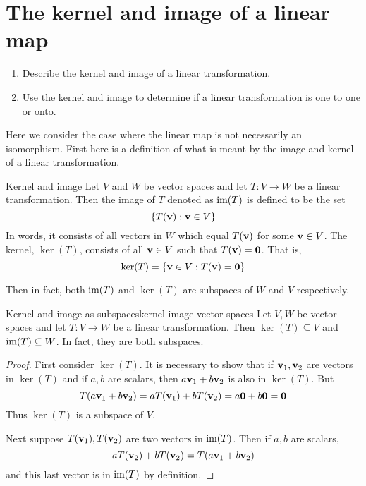 \section{The kernel and image of a linear map}

\begin{outcome}
  \begin{enumerate}
  \item Describe the kernel and image of a linear transformation.
  \item Use the kernel and image to determine if a linear
    transformation is one to one or onto.
  \end{enumerate}
\end{outcome}

Here we consider the case where the linear map is not necessarily an
isomorphism. First here is a definition of what is meant by the image and
kernel of a linear transformation.

\begin{definition}{Kernel and image}{}
Let $V$ and $W$ be vector spaces and let $T:V\rightarrow W$ be a linear transformation. Then the image of $T$
denoted as $\mbox{\rm im}(T) $ is defined to be the set
\begin{equation*}
\left\{T(\mbox{\bf v}):\mbox{\bf v}\in V\right\}
\end{equation*}
In words, it consists of all vectors in $W$ which equal $T(\mbox{\bf v})$ for some $
\mbox{\bf v}\in V$. The kernel, $\ker (T)$,
consists of all $\mbox{\bf v}\in V$ such that $T(\mbox{\bf v})=\mbox{\bf 0}$. That is,
\begin{equation*}
\ker (T) =\left\{\mbox{\bf v}\in V:T(\mbox{\bf v})=\mbox{\bf 0}\right\}
\end{equation*}
\end{definition}

Then in fact, both $\mbox{\rm im}(T) $ and $\ker (T) $
are subspaces of $W$ and $V$ respectively.

\begin{proposition}{Kernel and image as subspaces}{kernel-image-vector-spaces}
Let $V,W$ be vector spaces and let $T:V\rightarrow W$ be a linear transformation. Then $\ker (
T) \subseteq V$ and $\mbox{\rm im}(T) \subseteq W$. In fact, they are both subspaces.
\end{proposition}

\begin{proof}
First consider $\ker (T)$. It is necessary to
show that if $\mbox{\bf v}_{1},\mbox{\bf v}_{2}$ are vectors in $\ker (T) $
and if $a,b$ are scalars, then $a\mbox{\bf v}_{1}+b\mbox{\bf v}_{2}$ is also in $\ker
(T)$. But
\begin{equation*}
T(a\mbox{\bf v}_{1}+b\mbox{\bf v}_{2}) =aT(\mbox{\bf v}_{1})+bT(\mbox{\bf v}_{2})=a\mbox{\bf 0}+b\mbox{\bf 0}=\mbox{\bf 0}
\end{equation*}
Thus $\ker (T) $ is a subspace of $V$.

Next suppose $T(\mbox{\bf v}_{1}),T(\mbox{\bf v}_{2})$ are two vectors in $\mbox{\rm im}(
T)$. Then if $a,b$ are scalars,
\begin{equation*}
aT(\mbox{\bf v}_{2})+bT(\mbox{\bf v}_{2})=T(a\mbox{\bf v}_{1}+b\mbox{\bf v}_{2})
\end{equation*}
and this last vector is in $\mbox{\rm im}(T) $ by definition.
\end{proof}


